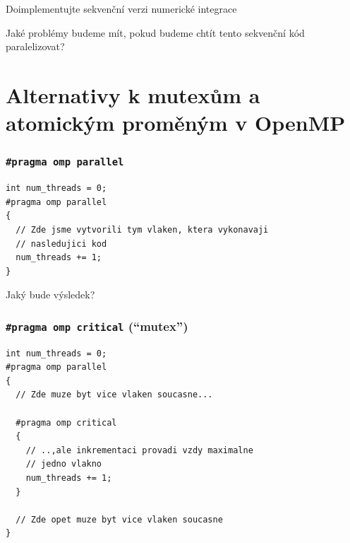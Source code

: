 \documentclass[usenames,dvipsnames,9pt]{beamer}
\begin{document}
{\begin{frame}[fragile]
\begin{block}{Doimplementujte sekvenční verzi numerické integrace}
  \end{block}

  \pause
  \vspace{0.2em}
  \begin{center}
    \Large
    Jaké problémy budeme mít, pokud budeme chtít tento sekvenční kód paralelizovat?
  \end{center}
\end{frame}
}

\section{Alternativy k mutexům a atomickým proměným v OpenMP}

\begin{frame}[fragile]
  \frametitle{\texttt{\#pragma omp parallel}}
  \begin{verbatim}
int num_threads = 0;
#pragma omp parallel
{
  // Zde jsme vytvorili tym vlaken, ktera vykonavaji
  // nasledujici kod
  num_threads += 1; 
}
  \end{verbatim}

  \pause

  \begin{center}
    \Large Jaký bude výsledek?
  \end{center}
\end{frame}

\begin{frame}[fragile]
  \frametitle{\texttt{\#pragma omp critical} \hspace{10pt} (``mutex'')}
  \begin{verbatim}
int num_threads = 0;
#pragma omp parallel
{
  // Zde muze byt vice vlaken soucasne...

  #pragma omp critical
  {
    // ..,ale inkrementaci provadi vzdy maximalne
    // jedno vlakno
    num_threads += 1; 
  }

  // Zde opet muze byt vice vlaken soucasne
}
  \end{verbatim}
\end{frame}
\end{document}
